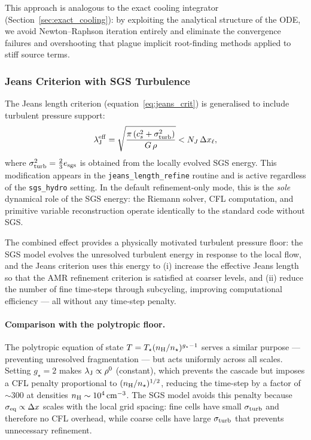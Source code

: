\documentclass[fleqn,usenatbib]{mnras}
\newcommand{\lJ}{\lambda_{\rm J}}
\newcommand{\nstar}{n_\star}
\newcommand{\gstar}{g_\star}
\newcommand{\dx}{\Delta x}
\newcommand{\code}[1]{\texttt{#1}}
\begin{document}
This approach is analogous to the exact cooling integrator
(Section~\ref{sec:exact_cooling}): by exploiting the analytical
structure of the ODE, we avoid Newton--Raphson iteration entirely
and eliminate the convergence failures and overshooting that plague
implicit root-finding methods applied to stiff source terms.


\subsubsection{Jeans Criterion with SGS Turbulence}
\label{sec:sgs_jeans}

The Jeans length criterion (equation~\ref{eq:jeans_crit}) is
generalised to include turbulent pressure support:
\begin{equation}
  \lJ^{\rm eff} =
  \sqrt{\frac{\pi\,(c_s^2 + \sigma_{\rm turb}^2)}{G\,\rho}}
  < N_J\,\dx_\ell,
  \label{eq:jeans_sgs}
\end{equation}
where $\sigma_{\rm turb}^2 = \frac{2}{3}e_{\rm sgs}$ is obtained
from the locally evolved SGS energy.  This modification appears in
the \code{jeans\_length\_refine} routine and is active regardless of
the \code{sgs\_hydro} setting.  In the default refinement-only mode,
this is the \emph{sole} dynamical role of the SGS energy: the
Riemann solver, CFL computation, and primitive variable reconstruction
operate identically to the standard code without SGS.

The combined effect provides a physically motivated turbulent
pressure floor: the SGS model evolves the unresolved turbulent energy
in response to the local flow, and the Jeans criterion uses this
energy to (i) increase the effective Jeans length so that the AMR
refinement criterion is satisfied at coarser levels, and (ii) reduce
the number of fine time-steps through subcycling, improving
computational efficiency --- all without any time-step penalty.

\paragraph{Comparison with the polytropic floor.}
The polytropic equation of state
$T = T_\star(n_{\rm H}/\nstar)^{\gstar - 1}$
serves a similar purpose --- preventing unresolved fragmentation
--- but acts uniformly across all scales.  Setting $\gstar = 2$
makes $\lJ \propto \rho^0$ (constant), which prevents the cascade
but imposes a CFL penalty proportional to $(n_{\rm H}/\nstar)^{1/2}$,
reducing the time-step by a factor of $\sim$300 at densities
$n_{\rm H} \sim 10^4\,{\rm cm^{-3}}$.  The SGS model avoids this
penalty because $\sigma_{\rm eq} \propto \dx$ scales with the local
grid spacing: fine cells have small $\sigma_{\rm turb}$ and therefore
no CFL overhead, while coarse cells have large $\sigma_{\rm turb}$
that prevents unnecessary refinement.
\end{document}
